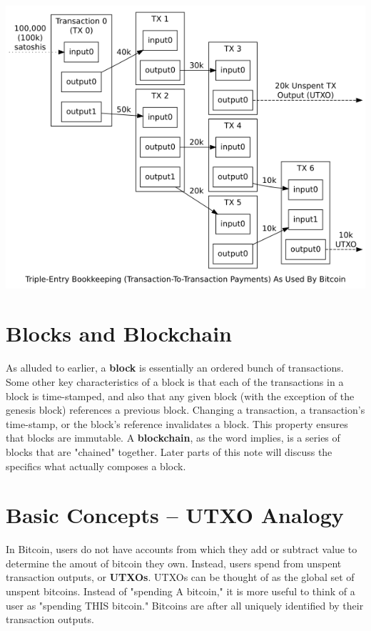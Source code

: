 \documentclass[11pt]{article}
\begin{document}
    \includegraphics[scale=0.9]{transactions}

    
    \section*{Blocks and Blockchain}
    
    As alluded to earlier, a \textbf{block} is essentially an ordered bunch of transactions. Some other key characteristics of a block is that each of the transactions in a block is time-stamped, and also that any given block (with the exception of the genesis block) references a previous block. Changing a transaction, a transaction's time-stamp, or the block's reference invalidates a block. This property ensures that blocks are immutable. A \textbf{blockchain}, as the word implies, is a series of blocks that are "chained" together. Later parts of this note will discuss the specifics what actually composes a block.
       
   \section*{Basic Concepts -- UTXO Analogy}
   
    In Bitcoin, users do not have accounts from which they add or subtract value to determine the amout of bitcoin they own. Instead, users spend from unspent transaction outputs, or \textbf{UTXOs}. UTXOs can be thought of as the global set of unspent bitcoins. Instead of "spending A bitcoin," it is more useful to think of a user as "spending THIS bitcoin." Bitcoins are after all uniquely identified by their transaction outputs. 
    
\end{document}
